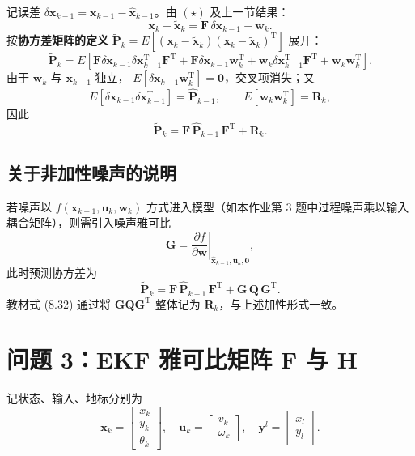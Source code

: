 \documentclass[12pt]{article}
\begin{document}
记误差 $\delta\mathbf{x}_{k-1}=\mathbf{x}_{k-1}-\hat{\mathbf{x}}_{k-1}$。由 $(\star)$ 及上一节结果：
\[
\mathbf{x}_k-\tilde{\mathbf{x}}_k=\mathbf{F}\,\delta\mathbf{x}_{k-1}+\mathbf{w}_k.
\]
按\textbf{协方差矩阵的定义}
$\tilde{\mathbf{P}}_k=E\!\left[(\mathbf{x}_k-\tilde{\mathbf{x}}_k)(\mathbf{x}_k-\tilde{\mathbf{x}}_k)^\mathrm{T}\right]$
展开：
\[
\tilde{\mathbf{P}}_k=
E\!\left[
\mathbf{F}\delta\mathbf{x}_{k-1}\delta\mathbf{x}_{k-1}^\mathrm{T}\mathbf{F}^\mathrm{T}
+\mathbf{F}\delta\mathbf{x}_{k-1}\mathbf{w}_k^\mathrm{T}
+\mathbf{w}_k\delta\mathbf{x}_{k-1}^\mathrm{T}\mathbf{F}^\mathrm{T}
+\mathbf{w}_k\mathbf{w}_k^\mathrm{T}
\right].
\]
由于 $\mathbf{w}_k$ 与 $\mathbf{x}_{k-1}$ 独立，
$E[\delta\mathbf{x}_{k-1}\mathbf{w}_k^\mathrm{T}]=\mathbf{0}$，交叉项消失；又
\[
E[\delta\mathbf{x}_{k-1}\delta\mathbf{x}_{k-1}^\mathrm{T}]=\hat{\mathbf{P}}_{k-1},
\qquad
E[\mathbf{w}_k\mathbf{w}_k^\mathrm{T}]=\mathbf{R}_k,
\]
因此
\[
\boxed{\;
\tilde{\mathbf{P}}_k=\mathbf{F}\,\hat{\mathbf{P}}_{k-1}\,\mathbf{F}^\mathrm{T}+\mathbf{R}_k.
\;}
\]

\subsection*{关于非加性噪声的说明}

若噪声以 $f(\mathbf{x}_{k-1},\mathbf{u}_k,\mathbf{w}_k)$ 方式进入模型（如本作业第 3 题中过程噪声乘以输入耦合矩阵），则需引入噪声雅可比
\[
\mathbf{G}=\left.\frac{\partial f}{\partial \mathbf{w}}\right|_{\hat{\mathbf{x}}_{k-1},\mathbf{u}_k,\mathbf{0}},
\]
此时预测协方差为
\[
\tilde{\mathbf{P}}_k=\mathbf{F}\,\hat{\mathbf{P}}_{k-1}\,\mathbf{F}^\mathrm{T}
+\mathbf{G}\,\mathbf{Q}\,\mathbf{G}^\mathrm{T}.
\]
教材式 (8.32) 通过将 $\mathbf{G}\mathbf{Q}\mathbf{G}^\mathrm{T}$ 整体记为 $\mathbf{R}_k$，与上述加性形式一致。

\newpage
\section*{问题 3：EKF 雅可比矩阵 $\mathbf{F}$ 与 $\mathbf{H}$}

记状态、输入、地标分别为
\[
\mathbf{x}_k=\begin{bmatrix}x_k\\ y_k\\ \theta_k\end{bmatrix},\quad
\mathbf{u}_k=\begin{bmatrix}v_k\\ \omega_k\end{bmatrix},\quad
\mathbf{y}^l=\begin{bmatrix}x_l\\ y_l\end{bmatrix}.
\]
\end{document}
